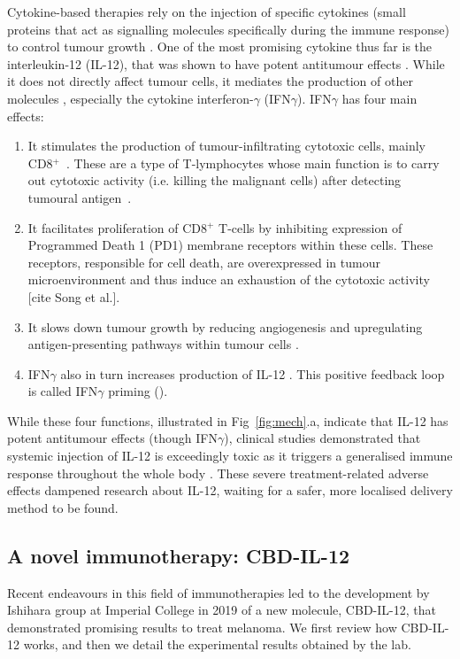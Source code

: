 \documentclass[11pt]{article}
\begin{document}
Cytokine-based therapies rely on the injection of specific cytokines (small proteins that act as signalling molecules specifically during the immune response) to control tumour growth \cite{ioDef}. One of the most promising cytokine thus far is the interleukin-12 (IL-12), that was shown to have potent antitumour effects \cite{il12IsCool}. While it does not directly affect tumour cells, it mediates the production of other molecules \cite{il12CytokineStorm}, especially the cytokine interferon-$\gamma$ (IFN$\gamma$). IFN$\gamma$ has four main effects:
\begin{enumerate}
    \item It stimulates the production of tumour-infiltrating cytotoxic cells, mainly CD8$^+$~\cite{ifngNKProd}\cite{ifnCD8}. These are a type of T-lymphocytes whose main function is to carry out cytotoxic activity (i.e. killing the malignant cells) after detecting tumoural antigen~\cite{cd8Effects}.     
    \item It facilitates proliferation of CD8$^+$ T-cells by inhibiting expression of Programmed Death 1 (PD1) membrane receptors within these cells. These receptors, responsible for cell death, are overexpressed in tumour microenvironment and thus induce an exhaustion of the cytotoxic activity [cite Song et al.].  
    \item It slows down tumour growth by reducing angiogenesis \cite{ifngAngiogenesis} and upregulating antigen-presenting pathways within tumour cells \cite{ifngAntigenExposure}.
    \item IFN$\gamma$ also in turn increases production of IL-12 \cite{wang}. This positive feedback loop is called IFN$\gamma$ priming (\cite{liuifng}\cite{ma2015}).
\end{enumerate}
While these four functions, illustrated in Fig~\ref{fig:mech}.a, indicate that IL-12 has potent antitumour effects (though IFN$\gamma$), clinical studies demonstrated that systemic injection of IL-12 is exceedingly toxic as it triggers a generalised immune response throughout the whole body \cite{clintriAC1}\cite{clintriAC2}. These severe treatment-related adverse effects dampened research about IL-12, waiting for a safer, more localised delivery method to be found.

\subsection{A novel immunotherapy: CBD-IL-12}
Recent endeavours in this field of immunotherapies led to the development by Ishihara group at Imperial College in 2019 \cite{cbdil12} of a new molecule, CBD-IL-12, that demonstrated promising results to treat melanoma. We first review how CBD-IL-12 works, and then we detail the experimental results obtained by the lab. 
\end{document}
